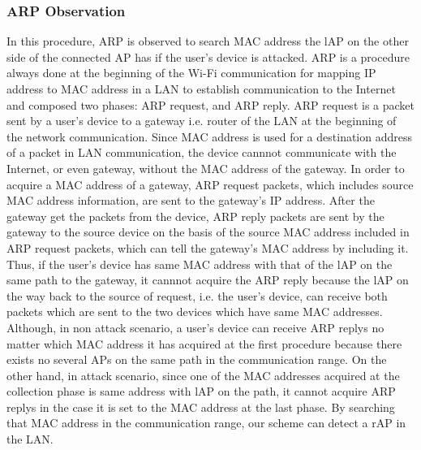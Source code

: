 \documentclass[conference]{IEEEtran}
\begin{document}
\subsubsection{ARP Observation}
In this procedure, ARP is observed to search MAC address the lAP on the other side of the connected AP has if the user's device is attacked.
ARP is a procedure always done at the beginning of the Wi-Fi communication for mapping IP address to MAC address in a LAN to establish communication to the Internet and composed two phases: ARP request, and ARP reply.
ARP request is a packet sent by a user's device to a gateway i.e. router of the LAN at the beginning of the network communication. 
Since MAC address is used for a destination address of a packet in LAN communication, the device cannnot communicate with the Internet, or even gateway, without the MAC address of the gateway.
In order to acquire a MAC address of a gateway, ARP request packets, which includes source MAC address information, are sent to the gateway's IP address. 
After the gateway get the packets from the device, ARP reply packets are sent by the gateway to the source device on the basis of the source MAC address included in ARP request packets, which can tell the gateway's MAC address by including it.
Thus, if the user's device has same MAC address with that of the lAP on the same path to the gateway, it cannnot acquire the ARP reply because the lAP on the way back to the source of request, i.e. the user's device, can receive both packets which are sent to the two devices which have same MAC addresses.
Although, in non attack scenario, a user's device can receive ARP replys no matter which MAC address it has acquired at the first procedure because there exists no several APs on the same path in the communication range.
On the other hand, in attack scenario, since one of the MAC addresses acquired at the collection phase is same address with lAP on the path, it cannot acquire ARP replys in the case it is set to the MAC address at the last phase.
By searching that MAC address in the communication range, our scheme can detect a rAP in the LAN. 
\end{document}
